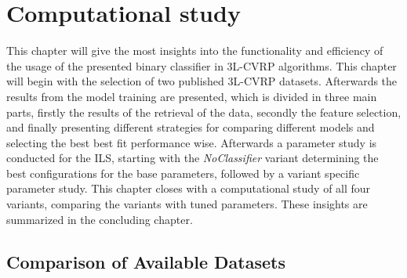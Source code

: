 \chapter{Computational study}
\label{chap:computational_study}
This chapter will give the most insights into the functionality and efficiency of the usage of the presented binary classifier in
\gls{3L-CVRP} algorithms. This chapter will begin with the selection of two published \gls{3L-CVRP} datasets.
Afterwards the results from the model training are presented, which
is divided in three main parts, firstly the results of the retrieval of the data, secondly the feature selection, and finally presenting
different strategies for comparing different models and selecting the best best fit performance wise.
Afterwards a parameter study is conducted for the \gls{ILS}, starting with the \textit{NoClassifier} variant determining
the best configurations for the base parameters, followed by a variant specific parameter study.
This chapter closes with a computational study of all four variants, comparing the variants with tuned parameters.
These insights are summarized in the concluding chapter.

\section{Comparison of Available Datasets}
\label{sec:dataset_comparison}


